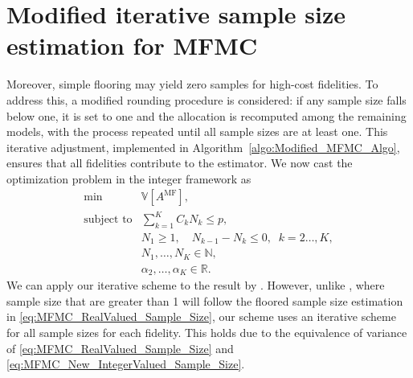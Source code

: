 \section{Modified iterative sample size estimation for MFMC}\label{sec:Modified_IntegerValued_Sample_Size}
Moreover, simple flooring may yield zero samples for high-cost fidelities. To address this, a modified rounding procedure \cite{GrGuJuWa:2023} is considered: if any sample size falls below one, it is set to one and the allocation is recomputed among the remaining models, with the process repeated until all sample sizes are at least one. This iterative adjustment, implemented in Algorithm~\ref{algo:Modified_MFMC_Algo}, ensures that all fidelities contribute to the estimator.
We now cast the optimization problem in the integer framework as
%
\begin{equation}\label{eq:Optimization_pb_integer}
    \begin{array}{ll}
    \min  &\mathbb{V}\left[A^{\text{MF}}\right],\\
       \text{subject to} &\displaystyle\sum\limits_{k=1}^K C_kN_k\le p,\\[2pt]
       &\displaystyle N_1\ge 1,\quad \displaystyle N_{k-1}-N_k\le 0, \;\; k=2\ldots,K,\\
       &N_1,\ldots, N_K\in \mathbb{N},\\
       &\alpha_2,\ldots,\alpha_K\in \mathbb{R}.
    \end{array}
\end{equation}
%
We can apply our iterative scheme to the result by \cite{GrGuJuWa:2023}. However, unlike \cite{GrGuJuWa:2023}, where sample size that are greater than 1 will follow the floored sample size estimation in \eqref{eq:MFMC_RealValued_Sample_Size}, our scheme uses an iterative scheme for all sample sizes for each fidelity. This holds due to the equivalence of variance of \eqref{eq:MFMC_RealValued_Sample_Size} and \eqref{eq:MFMC_New_IntegerValued_Sample_Size}.


